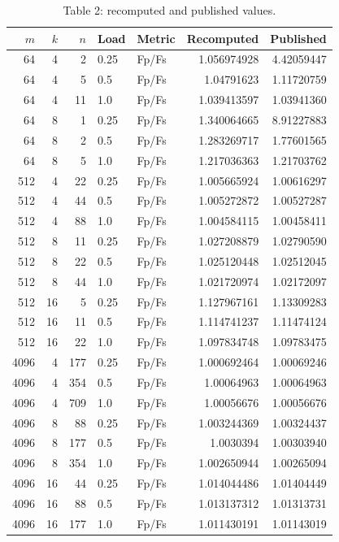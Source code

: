 \begin{longtable}{rrrllrr}
\caption{Table 2: recomputed and published values.}\\
$m$ & $k$ & $n$ & Load & Metric & Recomputed & Published \\
\hline
64 & 4 & 2 & 0.25 & Fp/Fs & 1.056974928 & 4.42059447 \\
64 & 4 & 5 & 0.5 & Fp/Fs & 1.04791623 & 1.11720759 \\
64 & 4 & 11 & 1.0 & Fp/Fs & 1.039413597 & 1.03941360 \\
64 & 8 & 1 & 0.25 & Fp/Fs & 1.340064665 & 8.91227883 \\
64 & 8 & 2 & 0.5 & Fp/Fs & 1.283269717 & 1.77601565 \\
64 & 8 & 5 & 1.0 & Fp/Fs & 1.217036363 & 1.21703762 \\
512 & 4 & 22 & 0.25 & Fp/Fs & 1.005665924 & 1.00616297 \\
512 & 4 & 44 & 0.5 & Fp/Fs & 1.005272872 & 1.00527287 \\
512 & 4 & 88 & 1.0 & Fp/Fs & 1.004584115 & 1.00458411 \\
512 & 8 & 11 & 0.25 & Fp/Fs & 1.027208879 & 1.02790590 \\
512 & 8 & 22 & 0.5 & Fp/Fs & 1.025120448 & 1.02512045 \\
512 & 8 & 44 & 1.0 & Fp/Fs & 1.021720974 & 1.02172097 \\
512 & 16 & 5 & 0.25 & Fp/Fs & 1.127967161 & 1.13309283 \\
512 & 16 & 11 & 0.5 & Fp/Fs & 1.114741237 & 1.11474124 \\
512 & 16 & 22 & 1.0 & Fp/Fs & 1.097834748 & 1.09783475 \\
4096 & 4 & 177 & 0.25 & Fp/Fs & 1.000692464 & 1.00069246 \\
4096 & 4 & 354 & 0.5 & Fp/Fs & 1.00064963 & 1.00064963 \\
4096 & 4 & 709 & 1.0 & Fp/Fs & 1.00056676 & 1.00056676 \\
4096 & 8 & 88 & 0.25 & Fp/Fs & 1.003244369 & 1.00324437 \\
4096 & 8 & 177 & 0.5 & Fp/Fs & 1.0030394 & 1.00303940 \\
4096 & 8 & 354 & 1.0 & Fp/Fs & 1.002650944 & 1.00265094 \\
4096 & 16 & 44 & 0.25 & Fp/Fs & 1.014044486 & 1.01404449 \\
4096 & 16 & 88 & 0.5 & Fp/Fs & 1.013137312 & 1.01313731 \\
4096 & 16 & 177 & 1.0 & Fp/Fs & 1.011430191 & 1.01143019 \\
\end{longtable}

